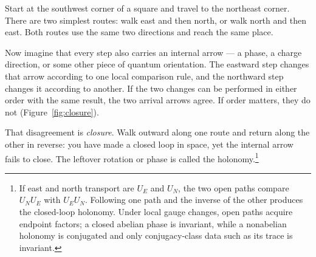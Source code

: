 \documentclass[11pt]{article}
\begin{document}
Start at the southwest corner of a square and travel to the northeast corner.
There are two simplest routes: walk east and then north, or walk north and then
east.  Both routes use the same two directions and reach the same place.

Now imagine that every step also carries an internal arrow --- a phase, a
charge direction, or some other piece of quantum orientation.  The eastward
step changes that arrow according to one local comparison rule, and the
northward step changes it according to another.  If the two changes can be
performed in either order with the same result, the two arrival arrows agree.
If order matters, they do not (Figure~\ref{fig:closure}).

That disagreement is \emph{closure}.  Walk outward along one route and return
along the other in reverse: you have made a closed loop in space, yet the
internal arrow fails to close.  The leftover rotation or phase is called the
holonomy.\footnote{If east and north transport are $U_E$ and $U_N$, the two
open paths compare $U_NU_E$ with $U_EU_N$.  Following one path and the inverse
of the other produces the closed-loop holonomy.  Under local gauge changes,
open paths acquire endpoint factors; a closed abelian phase is invariant,
while a nonabelian holonomy is conjugated and only conjugacy-class data such as
its trace is invariant.}
\end{document}

